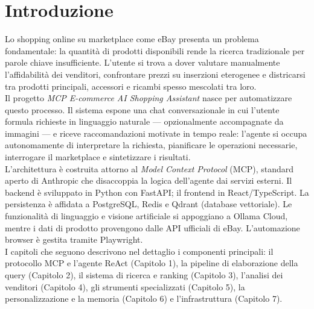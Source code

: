 \section*{Introduzione}

Lo shopping online su marketplace come eBay presenta un problema 
fondamentale: la quantità di prodotti disponibili rende la ricerca 
tradizionale per parole chiave insufficiente. L'utente si trova a 
dover valutare manualmente l'affidabilità dei venditori, confrontare 
prezzi su inserzioni eterogenee e districarsi tra prodotti principali, 
accessori e ricambi spesso mescolati tra loro.\\

\noindent
Il progetto \textit{MCP E-commerce AI Shopping Assistant} nasce per 
automatizzare questo processo. Il sistema espone una chat 
conversazionale in cui l'utente formula richieste in linguaggio 
naturale — opzionalmente accompagnate da immagini — e riceve 
raccomandazioni motivate in tempo reale: l'agente si occupa 
autonomamente di interpretare la richiesta, pianificare le operazioni 
necessarie, interrogare il marketplace e sintetizzare i risultati.\\

\noindent
L'architettura è costruita attorno al \textit{Model Context Protocol} 
(MCP), standard aperto di Anthropic che disaccoppia la logica 
dell'agente dai servizi esterni. Il backend è sviluppato in Python con 
FastAPI; il frontend in React/TypeScript. La persistenza è affidata a 
PostgreSQL, Redis e Qdrant (database vettoriale). Le funzionalità di 
linguaggio e visione artificiale si appoggiano a Ollama Cloud, mentre 
i dati di prodotto provengono dalle API ufficiali di eBay. 
L'automazione browser è gestita tramite Playwright.\\

\noindent
I capitoli che seguono descrivono nel dettaglio i componenti 
principali: il protocollo MCP e l'agente ReAct (Capitolo 1), la pipeline 
di elaborazione della query (Capitolo 2), il sistema di ricerca e ranking 
(Capitolo 3), l'analisi dei venditori (Capitolo 4), gli strumenti specializzati 
(Capitolo 5), la personalizzazione e la memoria (Capitolo 6) e l'infrastruttura 
(Capitolo 7).